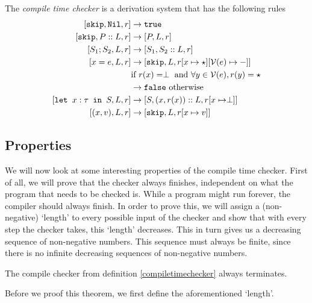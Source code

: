 \begin{definition}
\label{compiletimechecker}
The \emph{compile time checker} is a derivation system that has the following rules
\begin{align*}
\cc{\texttt{skip}}{\texttt{Nil}}{r} & \to \texttt{true}  \\
\cc{\texttt{skip}} {P::L}{ r}       & \to \cc{P}{L}{r}  \\
\cc{S_1; S_2}{L}{r}                 & \to \cc{S_1}{S_2::L}{r}  \\
\cc{x=e}{L}{r}                     & \to \cc{\texttt{skip}}{L}{r[x\mapsto \star][\mathcal{V}(e) \mapsto -]} \\
                                    & \textrm{if }r(x) = \perp \textrm{ and } \forall y \in \mathcal{V}(e), r(y) = \star \\
                                    & \to \texttt{false} \textrm{ otherwise}\\
\cc{\letm{x}{S}}{L}{r} & \to \cc{S}{(x,r(x))::L}{r[x\mapsto \perp]} \\
\cc{(x,v)}{L}{r}                    & \to \cc{\texttt{skip}}{L}{r[x \mapsto v]}
\end{align*}
\end{definition}

\subsection{Properties}
We will now look at some interesting properties of the compile time checker. First of all, we will prove that the checker always finishes, independent on what the program that needs to be checked is. While a program might run forever, the compiler should always finish. In order to prove this, we will assign a (non-negative) `length' to every possible input of the checker and show that with every step the checker takes, this `length' decreases. This in turn gives us a decreasing sequence of non-negative numbers. This sequence must always be finite, since there is no infinite decreasing sequences of non-negative numbers. 

\begin{theorem}
\label{termination}
The compile checker from definition \ref{compiletimechecker} always terminates.
\end{theorem}

Before we proof this theorem, we first define the aforementioned `length'. 

